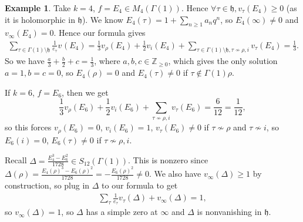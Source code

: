 \documentclass{article}
\theoremstyle{definition}
\newtheorem{example}{Example}[section]
\begin{document}

\begin{example}
    Take $k=4$, $f = E_4 \in M_{4}(\Gamma(1))$. Hence $\forall \tau \in \mathfrak{h}, v_{\tau}(E_4)\ge 0$ (as it is holomorphic in $\mathfrak{h}$). We know $E_4(\tau) = 1 + \sum_{n\ge 1}^{} a_nq^n$, so $E_4(\infty) \neq 0$ and $v_{\infty}(E_4) = 0$. Hence our formula gives 
    \begin{align*}
        \sum_{\tau \in \Gamma(1)\setminus \mathfrak{h}}^{} \frac{1}{e_{\tau}}v_{}(E_4) = \frac{1}{3} v_{\rho}(E_4) + \frac{1}{2}v_i(E_4) + \sum_{\tau \in \Gamma(1)\setminus \mathfrak{h}, \tau \not\sim \rho,i}^{} v_{\tau}(E_4) = \frac{1}{3}.
    \end{align*}
    So we have $\frac{a}{3}+\frac{b}{2}+c = \frac{1}{3}$, where $a,b,c \in \mathbb{Z}_{\ge 0}$, which gives the only solution $a=1, b=c=0$, so $E_4(\rho)=0$ and $E_4(\tau) \neq 0$ if $\tau \not\in \Gamma(1)\rho$.
    \vspace{1mm}
     
    If $k=6$, $f = E_6$, then we get \[
    \frac{1}{3}v_{\rho}(E_6) + \frac{1}{2}v_i(E_6) + \sum_{\tau \not\sim \rho,i}^{} v_{\tau}(E_6) = \frac{6}{12} = \frac{1}{12},
    \]
    so this forces $v_{\rho}(E_6) = 0$, $v_{i}(E_6) = 1$, $v_{\tau}(E_6) \neq 0$ if $\tau \not\sim \rho$ and $\tau \not\sim i$, so $E_6(i) = 0$, $E_6(\tau) \neq 0$ if $\tau \not\sim \rho,i$.
\end{example}
Recall $\Delta = \frac{E_4^3 - E_6^2}{1728} \in S_{12}(\Gamma(1))$. This is nonzero since $\Delta(\rho) = \frac{E_4(\rho)^3 - E_6(\rho)^2}{1728}  = -\frac{E_6(\rho)^2}{1728} \neq 0$. We also have $v_{\infty}(\Delta)\ge 1$ by construction, so plug in $\Delta$ to our formula to get 
\begin{align*}
    \sum_{\tau}^{} \frac{1}{e_{\tau}}v_{\tau}(\Delta) + v_{\infty}(\Delta) = 1,
\end{align*}
so $v_{\infty}(\Delta) = 1$, so $\Delta$ has a simple zero at $\infty$ and $\Delta$ is nonvanishing in $\mathfrak{h}$.
\end{document}
